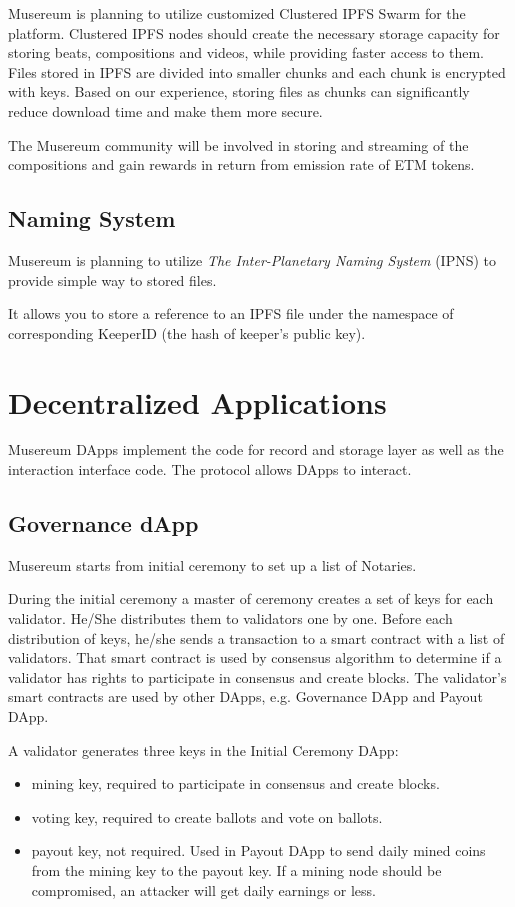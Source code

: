 \documentclass[12pt]{report}
\begin{document}
Musereum is planning to utilize customized Clustered IPFS Swarm for the platform. Clustered IPFS nodes should create the necessary storage capacity for storing beats, compositions and videos, while providing faster access to them. Files stored in IPFS are divided into smaller chunks and each chunk is encrypted with keys. Based on our experience, storing files as chunks can significantly reduce download time and make them more secure.

The Musereum community will be involved in storing and streaming of the compositions and gain rewards in return from emission rate of ETM tokens.
\subsection{Naming System}
\label{tech-storage-naming}
Musereum is planning to utilize \textit{The Inter-Planetary Naming System} (IPNS) to provide simple way to stored files. 

It allows you to store a reference to an IPFS file under the namespace of corresponding KeeperID (the hash of keeper's public key).

\section{Decentralized Applications}
\label{tech-apps}
Musereum DApps implement the code for record and storage layer as well as the interaction interface code. The protocol allows DApps to interact.

\subsection{Governance dApp}
\label{tech-apps-governance}
Musereum starts from initial ceremony to set up a list of Notaries.

During the initial ceremony a master of ceremony creates a set of keys for each validator. He/She distributes them to validators one by one. Before each distribution of keys, he/she sends a transaction to a smart contract with a list of validators. That smart contract is used by consensus algorithm to determine if a validator has rights to participate in consensus and create blocks. The validator’s smart contracts are used by other DApps, e.g. Governance DApp and Payout DApp.

A validator generates three keys in the Initial Ceremony DApp:
\begin{itemize}
	\item mining key, required to participate in consensus and create blocks.
	\item voting key, required to create ballots and vote on ballots.
	\item payout key, not required. Used in Payout DApp to send daily mined coins from the mining key to the payout key. If a mining node should be compromised, an attacker will get daily earnings or less.
\end{itemize}
\end{document}
